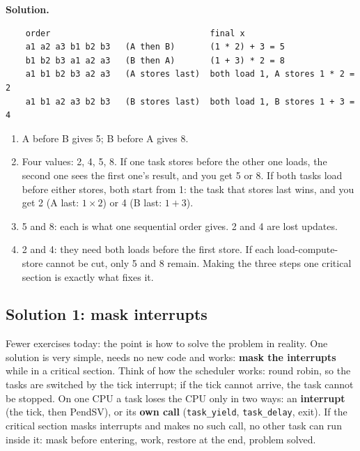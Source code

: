 \textbf{Solution.}
\begin{verbatim}
    order                                final x
    a1 a2 a3 b1 b2 b3   (A then B)       (1 * 2) + 3 = 5
    b1 b2 b3 a1 a2 a3   (B then A)       (1 + 3) * 2 = 8
    a1 b1 b2 b3 a2 a3   (A stores last)  both load 1, A stores 1 * 2 = 2
    a1 b1 a2 a3 b2 b3   (B stores last)  both load 1, B stores 1 + 3 = 4
\end{verbatim}
\begin{enumerate}
    \item A before B gives 5; B before A gives 8.
    \item Four values: 2, 4, 5, 8. If one task stores before the other one loads, the second one sees the first one's result, and you get 5 or 8. If both tasks load before either stores, both start from 1: the task that stores last wins, and you get 2 (A last: $1 \times 2$) or 4 (B last: $1 + 3$).
    \item 5 and 8: each is what one sequential order gives. 2 and 4 are lost updates.
    \item 2 and 4: they need both loads before the first store. If each load-compute-store cannot be cut, only 5 and 8 remain. Making the three steps one critical section is exactly what fixes it.
\end{enumerate}

\subsection{Solution 1: mask interrupts}
Fewer exercises today: the point is how to solve the problem in reality. One solution is very simple, needs no new code and works: \textbf{mask the interrupts} while in a critical section. Think of how the scheduler works: round robin, so the tasks are switched by the tick interrupt; if the tick cannot arrive, the task cannot be stopped. On one CPU a task loses the CPU only in two ways: an \textbf{interrupt} (the tick, then PendSV), or its \textbf{own call} (\texttt{task\_yield}, \texttt{task\_delay}, exit). If the critical section masks interrupts and makes no such call, no other task can run inside it: mask before entering, work, restore at the end, problem solved.

